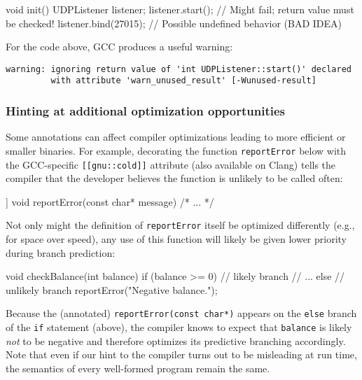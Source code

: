 \begin{emcppslisting}[emcppsbatch=e5]
void init()
{
    UDPListener listener;
    listener.start();      // Might fail; return value must be checked!
    listener.bind(27015);  // Possible undefined behavior (BAD IDEA)
}
\end{emcppslisting}

\noindent For the code above, GCC produces a useful warning:

\begin{lstlisting}[style=plain]
warning: ignoring return value of 'int UDPListener::start()' declared
         with attribute 'warn_unused_result' [-Wunused-result]
\end{lstlisting}


\subsubsection[Hinting at additional optimization opportunities]{Hinting at additional optimization opportunities}\label{hinting-at-additional-optimization-opportunities}

Some annotations can affect compiler optimizations leading to more
efficient or smaller binaries. For example, decorating the function
\lstinline!reportError! below with the GCC-specific
\lstinline![[gnu::cold]]! attribute (also available on Clang) tells the
compiler that the developer believes the function is unlikely to be
called often:

\begin{emcppslisting}[emcppsbatch=e6]
[[gnu::cold]] void reportError(const char* message) { /* ... */ }
\end{emcppslisting}

\noindent Not only might the definition of \lstinline!reportError! itself be
optimized differently (e.g., for space over speed), any use of this
function will likely be given lower priority during branch \mbox{prediction}:

\begin{emcppslisting}[emcppsbatch=e6]
void checkBalance(int balance)
{
    if (balance >= 0)  // likely branch
    {
        // ...
    }
    else  // unlikely branch
    {
        reportError("Negative balance.");
    }
}
\end{emcppslisting}

\noindent Because the (annotated) \lstinline!reportError(const!~\lstinline!char*)!
appears on the \lstinline!else! branch of the \lstinline!if! statement (above), the compiler
knows to expect that \lstinline!balance! is likely \pagebreak%
\emph{not} to be negative  
and therefore optimizes its predictive branching accordingly.
Note that even if our hint to the compiler turns out to be misleading at
run time, the semantics of every well-formed program remain the same.

